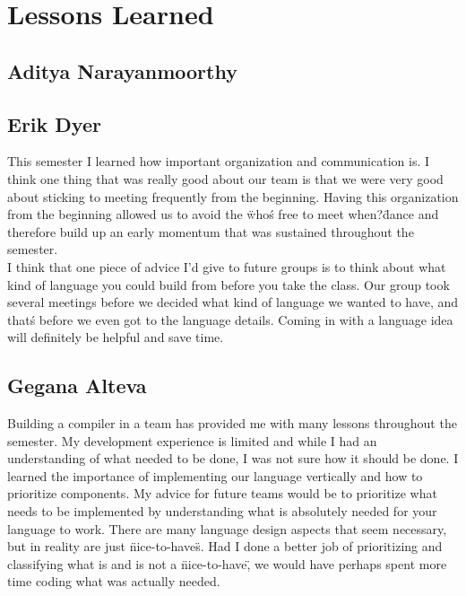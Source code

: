 \documentclass[letterpaper,12pt]{report}
\begin{document}
\chapter{Lessons Learned}
  
  \section{Aditya Narayanmoorthy}

  \section{Erik Dyer}
    This semester I learned how important organization and communication is. I think one thing that was really good about our team is that we were very good about sticking to meeting frequently from the beginning. Having this organization from the beginning allowed us to avoid the \"who\'s free to meet when?\" dance and therefore build up an early momentum that was sustained throughout the semester.\\

    I think that one piece of advice I'd give to future groups is to think about what kind of language you could build from before you take the class. Our group took several meetings before we decided what kind of language we wanted to have, and that\'s before we even got to the language details. Coming in with a language idea will definitely be helpful and save time.

  \section{Gegana Alteva}
    Building a compiler in a team has provided me with many lessons throughout the semester. My development experience is limited and while I had an understanding of what needed to be done, I was not sure how it should be done. I learned the importance of implementing our language vertically and how to prioritize components. My advice for future teams would be to prioritize what needs to be implemented by understanding what is absolutely needed for your language to work. There are many language design aspects that seem necessary, but in reality are just \"nice-to-have\"s. Had I done a better job of prioritizing and classifying what is and is not a \"nice-to-have\", we would have perhaps spent more time coding what was actually needed.
\end{document}
